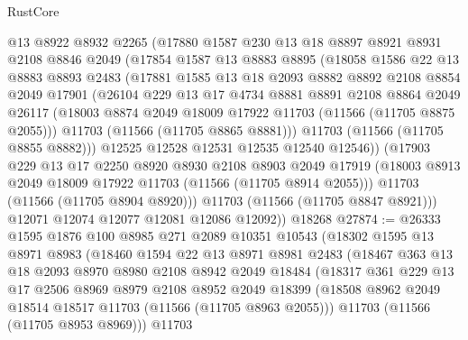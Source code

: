 \begin{lexlean}{RustCore}
\begin{coremodule}
        @13
        @8922
        @8932
        @2265
        (@17880
          @1587
          @230
          @13
          @18
          @8897
          @8921
          @8931
          @2108
          @8846
          @2049
          (@17854
            @1587
            @13
            @8883
            @8895
            (@18058
              @1586
              @22
              @13
              @8883
              @8893
              @2483
              (@17881
                @1585
                @13
                @18
                @2093
                @8882
                @8892
                @2108
                @8854
                @2049
                @17901
                (@26104
                  @229
                  @13
                  @17
                  @4734
                  @8881
                  @8891
                  @2108
                  @8864
                  @2049
                  @26117
                  (@18003 @8874 @2049 @18009 @17922 @11703 (@11566 (@11705 @8875 @2055)))
                  @11703
                  (@11566 (@11705 @8865 @8881)))
                @11703
                (@11566 (@11705 @8855 @8882)))
              @12525
              @12528
              @12531
              @12535
              @12540
              @12546))
          (@17903
            @229
            @13
            @17
            @2250
            @8920
            @8930
            @2108
            @8903
            @2049
            @17919
            (@18003 @8913 @2049 @18009 @17922 @11703 (@11566 (@11705 @8914 @2055)))
            @11703
            (@11566 (@11705 @8904 @8920)))
          @11703
          (@11566 (@11705 @8847 @8921)))
        @12071
        @12074
        @12077
        @12081
        @12086
        @12092))
    @18268
@27874 := @26333
    @1595
    @1876
    @100
    @8985
    @271
    @2089
    @10351
    @10543
    (@18302
      @1595
      @13
      @8971
      @8983
      (@18460
        @1594
        @22
        @13
        @8971
        @8981
        @2483
        (@18467
          @363
          @13
          @18
          @2093
          @8970
          @8980
          @2108
          @8942
          @2049
          @18484
          (@18317
            @361
            @229
            @13
            @17
            @2506
            @8969
            @8979
            @2108
            @8952
            @2049
            @18399
            (@18508 @8962 @2049 @18514 @18517 @11703 (@11566 (@11705 @8963 @2055)))
            @11703
            (@11566 (@11705 @8953 @8969)))
          @11703

\end{coremodule}
\end{lexlean}
